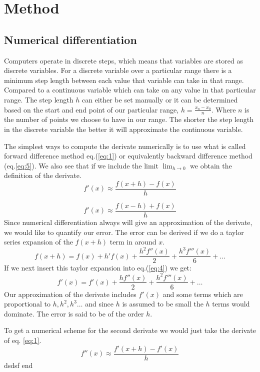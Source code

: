 \section*{Method}
\subsection*{Numerical differentiation}
\par Computers operate in discrete steps, which means that variables are stored as discrete variables. For a discrete variable over a particular range there is a minimum step length between each value that variable can take in that range. Compared to a continuous variable which can take on any value in that particular range. The step length $h$ can either be set manually or it can be determined based on the start and end point of our particular range, $h = \frac{x_n -x_0}{n}$. Where $n$ is the number of points we choose to have in our range. The shorter the step length in the discrete variable the better it will approximate the continuous variable.  
\par
The simplest ways to compute the derivate numerically is to use what is called forward difference method eq.(\ref{eq:1}) or equivalently backward difference method (eq.\ref{eq:5}). We also see that if we include the limit $\lim_{h\to 0}$ we obtain the definition of the derivate. 
\begin{equation}\label{eq:1}
    f'(x) \approx \frac{f(x+h)-f(x)}{h}
\end{equation}

\begin{equation}\label{eq:5}
  f'(x) \approx \frac{f(x-h)+f(x)}{h}
\end{equation}
Since numerical differentiation always will give an approximation of the derivate, we would like to quantify our error. The error can be derived if we do a taylor series expansion of the $f(x+h)$ term in around $x$.
\begin{equation}\label{eq:4}
    f(x+h) = f(x) + h'f(x) + \frac{h^2f''(x)}{2} + \frac{h^3f'''(x)}{6} + \dots    
\end{equation}   
If we next insert this taylor expansion into eq.(\ref{eq:4}) we get:
\begin{equation}
  f'(x) = f'(x) + \frac{h f''(x)}{2} + \frac{h^2f'''(x)}{6} + \dots
\end{equation} 
Our approximation of the derivate includes $f'(x)$ and some terms which are proportional to $h, h^2, h^3 \dots $ and since $h$ is assumed to be small the $h$ terms would dominate. The error is said to be of the order $h$. 
\par
To get a numerical scheme for the second derivate we would just take the derivate of eq. \ref{eq:1}. 
\begin{equation}
  f''(x) \approx \frac{f'(x+h)-f'(x)}{h}
\end{equation}
dsdsf end
